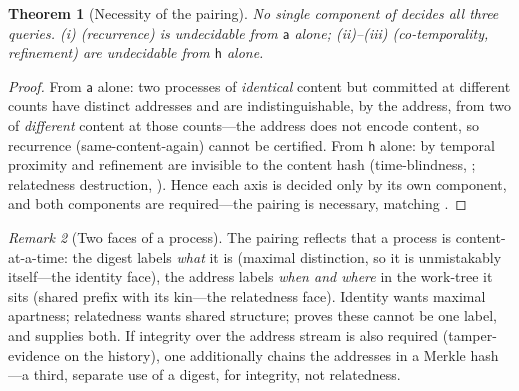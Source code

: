 \documentclass[twocolumn,10pt,a4paper]{article}
\theoremstyle{thmstyle}
\newtheorem{theorem}{Theorem}[section]
\theoremstyle{definition}
\theoremstyle{remark}
\newtheorem{remark}[theorem]{Remark}
\newcommand{\Addr}{\mathsf{a}}
\newcommand{\dig}{\mathsf{h}}
\begin{document}
\begin{theorem}[Necessity of the pairing]
\label{thm:necessity}
No single component of  decides all three queries.
(i) (recurrence) is undecidable from $\Addr$ alone;
(ii)--(iii) (co-temporality, refinement) are
undecidable from $\dig$ alone.
\end{theorem}

\begin{proof}
From $\Addr$ alone: two processes of \emph{identical} content but
committed at different counts have distinct addresses and are
indistinguishable, by the address, from two of \emph{different} content at
those counts---the address does not encode content, so recurrence
(same-content-again) cannot be certified. From $\dig$ alone: by
 temporal proximity and refinement are invisible to
the content hash (time-blindness, ; relatedness
destruction, ). Hence each axis is decided only by
its own component, and both components are required---the pairing is
necessary, matching .
\end{proof}

\begin{remark}[Two faces of a process]
\label{rem:two-faces}
The pairing reflects that a process is content-at-a-time: the digest
labels \emph{what} it is (maximal distinction, so it is unmistakably
itself---the identity face), the address labels \emph{when and where} in
the work-tree it sits (shared prefix with its kin---the relatedness
face). Identity wants maximal apartness; relatedness wants shared
structure;  proves these cannot be one label, and
 supplies both. If integrity over the address stream is
also required (tamper-evidence on the history), one additionally chains
the addresses in a Merkle hash \citep{merkle1988,damgaard1989}---a third,
separate use of a digest, for integrity, not relatedness.
\end{remark}
\end{document}
